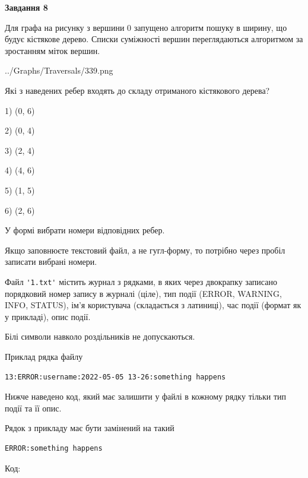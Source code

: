 \documentclass[12pt, ukrainian]{article}
\def\code#1{\Verb!#1!}
\begin{document}
{\begin {large}
{\begin {center}\textbf{Завдання 8}\end {center}}\par
Для графа на рисунку з вершини 0 запущено алгоритм пошуку в ширину, що будує кістякове дерево. Списки суміжності вершин переглядаються алгоритмом за зростанням міток вершин.\par
\begin{center}
	{../Graphs/Traversals/339.png}
\end{center}
\par Які з наведених ребер входять до складу отриманого кістякового дерева?\par
1) (0, 6)\par
2) (0, 4)\par
3) (2, 4)\par
4) (4, 6)\par
5) (1, 5)\par
6) (2, 6)\par
{\vskip 15pt} У формі вибрати номери відповідних ребер.


Якщо заповнюєте текстовий файл, а не гугл-форму, то потрібно через пробіл записа\-ти вибрані номери.\par
\newpage


Файл \code{'1.txt'} містить журнал з рядками, в яких через двокрапку записано поряд\-ко\-вий номер запису в журналі (ціле), тип події (ERROR, WARNING, INFO, STATUS), ім'я користувача (складається з латиниці), час події (фор\-мат як у прикладі), опис події.

Білі символи навколо роздільників не допускаються.

Приклад рядка файлу



\begin{verbatim}
13:ERROR:username:2022-05-05 13-26:something happens
\end{verbatim}


Нижче наведено код, який має залишити у файлі в кожному рядку тільки тип події та її опис.

Рядок з прикладу має бути замінений на такий



\begin{verbatim}
ERROR:something happens
\end{verbatim}




Код:




\end{large}}
\end{document}
